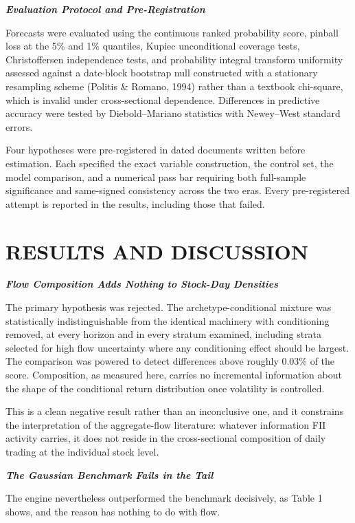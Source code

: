 \documentclass[12pt]{article}
\begin{document}
\textbf{\emph{Evaluation Protocol and Pre-Registration}}

Forecasts were evaluated using the continuous ranked probability score,
pinball loss at the 5\% and 1\% quantiles, Kupiec unconditional coverage
tests, Christoffersen independence tests, and probability integral transform
uniformity assessed against a date-block bootstrap null constructed with a
stationary resampling scheme (Politis \& Romano, 1994) rather than a textbook
chi-square, which is invalid under cross-sectional dependence. Differences in
predictive accuracy were tested by Diebold--Mariano statistics with
Newey--West standard errors.

Four hypotheses were pre-registered in dated documents written before
estimation. Each specified the exact variable construction, the control set,
the model comparison, and a numerical pass bar requiring both full-sample
significance and same-signed consistency across the two eras. Every
pre-registered attempt is reported in the results, including those that
failed.

\section*{RESULTS AND DISCUSSION}

\textbf{\emph{Flow Composition Adds Nothing to Stock-Day Densities}}

The primary hypothesis was rejected. The archetype-conditional mixture was
statistically indistinguishable from the identical machinery with conditioning
removed, at every horizon and in every stratum examined, including strata
selected for high flow uncertainty where any conditioning effect should be
largest. The comparison was powered to detect differences above roughly 0.03\%
of the score. Composition, as measured here, carries no incremental
information about the shape of the conditional return distribution once
volatility is controlled.

This is a clean negative result rather than an inconclusive one, and it
constrains the interpretation of the aggregate-flow literature: whatever
information FII activity carries, it does not reside in the cross-sectional
composition of daily trading at the individual stock level.

\textbf{\emph{The Gaussian Benchmark Fails in the Tail}}

The engine nevertheless outperformed the benchmark decisively, as Table 1
shows, and the reason has nothing to do with flow.
\end{document}
